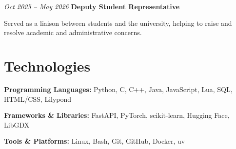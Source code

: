 \documentclass{cv}
\begin{document}
        \vspace{0.13 cm}

        \begin{twocolentry}{
        \textit{Oct 2025 – May 2026}}
            \textbf{Deputy Student Representative}
        \end{twocolentry}

        \vspace{0.10 cm}
        \begin{onecolentry}
            \begin{highlights}
                \item Served as a liaison between students and the university, helping to raise and resolve academic and administrative concerns.
            \end{highlights}
        \end{onecolentry}

    \section{Technologies}

        \begin{onecolentry}
            \textbf{Programming Languages:} Python, C, C++, Java, JavaScript, Lua, SQL, HTML/CSS, Lilypond
        \end{onecolentry}

        \vspace{0.13 cm}

        \begin{onecolentry}
            \textbf{Frameworks \& Libraries:} FastAPI, PyTorch, scikit-learn, Hugging Face, LibGDX
        \end{onecolentry}

        \vspace{0.13 cm}

        \begin{onecolentry}
            \textbf{Tools \& Platforms:} Linux, Bash, Git, GitHub, Docker, uv
        \end{onecolentry}
\end{document}
